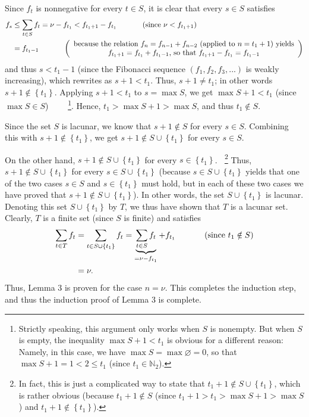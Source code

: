 \documentclass[numbers=enddot,12pt,final,onecolumn,notitlepage]{scrartcl}%
\numberwithin{exer}{section}
\theoremstyle{definition}
\let\sumnonlimits\sum
\renewcommand{\sum}{\sumnonlimits\limits}
\begin{document}
Since $f_{t}$ is nonnegative for every $t\in S$, it is clear that every $s\in
S$ satisfies%
\begin{align*}
f_{s}  &  \leq\sum\limits_{t\in S}f_{t}=\nu-f_{t_{1}}<f_{t_{1}+1}-f_{t_{1}%
}\ \ \ \ \ \ \ \ \ \ \left(  \text{since }\nu<f_{t_{1}+1}\right) \\
&  =f_{t_{1}-1}\ \ \ \ \ \ \ \ \ \ \left(
\begin{array}
[c]{c}%
\text{because the relation }f_{n}=f_{n-1}+f_{n-2}\text{ (applied to }%
n=t_{1}+1\text{) yields}\\
f_{t_{1}+1}=f_{t_{1}}+f_{t_{1}-1}\text{, so that }f_{t_{1}+1}-f_{t_{1}%
}=f_{t_{1}-1}%
\end{array}
\right)
\end{align*}
and thus $s<t_{1}-1$ (since the Fibonacci sequence $\left(  f_{1},f_{2}%
,f_{3},...\right)  $ is weakly increasing), which rewrites as $s+1<t_{1}$.
Thus, $s+1\neq t_{1}$; in other words $s+1\notin\left\{  t_{1}\right\}  $.
Applying $s+1<t_{1}$ to $s=\max S$, we get $\max S+1<t_{1}$ (since $\max S \in
S$) \ \ \ \ \footnote{Strictly speaking, this argument only works when $S$ is
nonempty. But when $S$ is empty, the inequality $\max S + 1 < t_{1}$ is
obvious for a different reason: Namely, in this case, we have $\max S =
\max\varnothing= 0$, so that $\max S + 1 = 1 < 2 \leq t_{1}$ (since $t_{1}
\in\mathbb{N}_{2}$).}. Hence, $t_{1} > \max S + 1 > \max S$, and thus $t_{1}
\notin S$.

Since the set $S$ is lacunar, we know that $s+1\notin S$ for every $s\in S$.
Combining this with $s+1\notin\left\{  t_{1}\right\}  $, we get $s+1\notin
S\cup\left\{  t_{1}\right\}  $ for every $s\in S$.

On the other hand, $s+1\notin S\cup\left\{  t_{1}\right\}  $ for every
$s\in\left\{  t_{1}\right\}  $.$\ \ \ \ $\footnote{In fact, this is just a
complicated way to state that $t_{1}+1\notin S\cup\left\{  t_{1}\right\}  $,
which is rather obvious (because $t_{1}+1\notin S$ (since $t_{1}+1>t_{1}>\max
S+1>\max S$) and $t_{1}+1\notin\left\{  t_{1}\right\}  $).} Thus, $s+1\notin
S\cup\left\{  t_{1}\right\}  $ for every $s\in S\cup\left\{  t_{1}\right\}  $
(because $s\in S\cup\left\{  t_{1}\right\}  $ yields that one of the two cases
$s\in S$ and $s\in\left\{  t_{1}\right\}  $ must hold, but in each of these
two cases we have proved that $s+1\notin S\cup\left\{  t_{1}\right\}  $). In
other words, the set $S\cup\left\{  t_{1}\right\}  $ is lacunar. Denoting this
set $S\cup\left\{  t_{1}\right\}  $ by $T$, we thus have shown that $T$ is a
lacunar set. Clearly, $T$ is a finite set (since $S$ is finite) and satisfies%
\begin{align*}
\sum\limits_{t\in T}f_{t}  &  =\sum\limits_{t\in S\cup\left\{  t_{1}\right\}
}f_{t}=\underbrace{\sum\limits_{t\in S}f_{t}}_{=\nu-f_{t_{1}}}+f_{t_{1}%
}\ \ \ \ \ \ \ \ \ \ \left(  \text{since }t_{1}\notin S\right) \\
&  =\nu.
\end{align*}
Thus, Lemma 3 is proven for the case $n=\nu$. This completes the induction
step, and thus the induction proof of Lemma 3 is complete.
\end{document}
